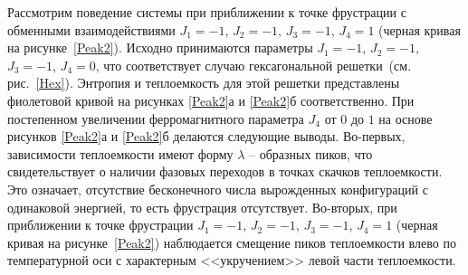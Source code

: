 \documentclass[utf8,12pt]{jetp}
\begin{document}
Рассмотрим поведение системы при приближении к точке фрустрации с обменными взаимодействиями $J_1 = -1$, $J_2 = -1$, $J_3 = -1$, $J_4 = 1$ (черная кривая на рисунке~\ref{Peak2}). Исходно принимаются параметры $J_1 = -1$, $J_2 = -1$, $J_3 = -1$, $J_4 = 0$, что соответствует случаю гексагональной решетки~(см. рис.~\ref{Hex}). Энтропия и теплоемкость для этой решетки представлены фиолетовой кривой на рисунках \ref{Peak2}а и \ref{Peak2}б соответственно. При постепенном увеличении ферромагнитного параметра $J_4$ от $0$ до $1$ на основе рисунков \ref{Peak2}а и \ref{Peak2}б делаются следующие выводы. Во-первых, зависимости теплоемкости имеют форму $\lambda$ -- образных пиков, что свидетельствует о наличии фазовых переходов в точках скачков теплоемкости. Это означает, отсутствие бесконечного числа вырожденных конфигураций с одинаковой энергией, то есть фрустрация отсутствует. Во-вторых, при приближении к точке фрустрации $J_1 = -1$, $J_2 = -1$, $J_3 = -1$, $J_4 = 1$ (черная кривая на рисунке~\ref{Peak2}) наблюдается смещение пиков теплоемкости влево по температурной оси с характерным <<укручением>> левой части теплоемкости.
\end{document}

